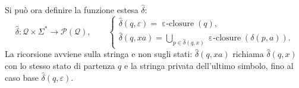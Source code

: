\documentclass[a4paper, 11pt, oneside]{book}
\theoremstyle{formale}
\DeclareMathOperator{\eclosure}{\varepsilon\text{-}closure}
\begin{document}
    Si pu\`o ora definire la funzione estesa $\hat{\delta}$:
    \begin{equation*}
        \hat{\delta} \colon \mathcal{Q} \times \Sigma^* \to \mathcal{P}(\mathcal{Q}),
        \qquad
        \begin{cases}
            \hat{\delta}(q, \varepsilon) = \eclosure(q), \\
            \hat{\delta}(q, xa) = \bigcup_{p \in \hat{\delta}(q, x)}
                \eclosure(\delta(p, a)).
        \end{cases}
    \end{equation*}
    La ricorsione avviene sulla stringa e non sugli stati: $\hat{\delta}(q, xa)$ richiama
    $\hat{\delta}(q, x)$ con lo stesso stato di partenza $q$ e la stringa privata
    dell'ultimo simbolo, fino al caso base $\hat{\delta}(q, \varepsilon)$.
\end{document}
